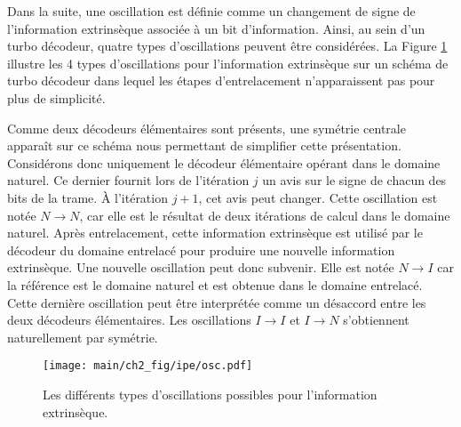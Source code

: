 

Dans la suite, une oscillation est définie comme un changement de signe de l'information extrinsèque associée à un bit
d'information. Ainsi, au sein d'un turbo décodeur, quatre types d'oscillations peuvent être considérées. La Figure 
\ref{fig:osc} illustre les 4 types d’oscillations pour l'information extrinsèque sur un schéma de turbo décodeur dans 
lequel les étapes d'entrelacement n’apparaissent pas pour plus de simplicité.

Comme deux décodeurs élémentaires sont présents, une symétrie centrale apparaît sur ce schéma nous permettant de simplifier
cette présentation. Considérons donc uniquement le décodeur élémentaire opérant dans le domaine naturel. Ce dernier 
fournit lors de l'itération $j$ un avis sur le signe de chacun des bits de la trame. À l'itération $j+1$, cet avis peut
changer. Cette oscillation est notée $N\rightarrow N$, car elle est le résultat de deux itérations de calcul dans le 
domaine naturel. Après entrelacement, cette information extrinsèque est utilisé par le décodeur du domaine entrelacé 
pour produire une nouvelle information extrinsèque. Une nouvelle oscillation peut donc subvenir. Elle est notée $N\rightarrow I$
car la référence est le domaine naturel et est obtenue dans le domaine entrelacé. Cette dernière oscillation peut être 
interprétée comme un désaccord entre les deux décodeurs élémentaires. Les oscillations $I\rightarrow I$ et $I\rightarrow N$
s'obtiennent naturellement par symétrie.

\begin{figure}[tb]
	\centering
	\texttt{[image: main/ch2\_fig/ipe/osc.pdf]}
	\caption{\label{fig:osc}Les différents types d'oscillations possibles pour l'information extrinsèque.}
\end{figure}

